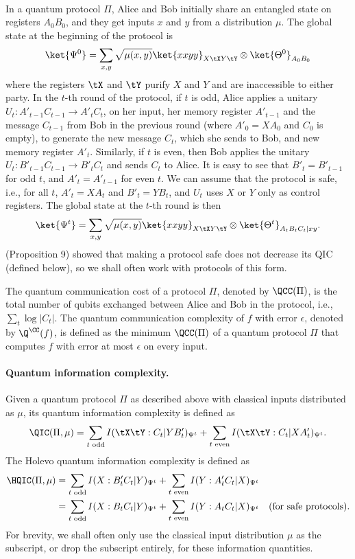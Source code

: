 \paragraph{} In a quantum protocol $\Pi$, Alice and Bob initially share an entangled state on registers $A_0B_0$, and they get inputs $x$ and $y$ from a distribution $\mu$. The global state at the beginning of the protocol is
\[ \ket{\Psi^0} = \sum_{x,y}\sqrt{\mu(x,y)}\ket{xxyy}_{X\tX Y\tY}\otimes\ket{\Theta^0}_{A_0B_0}\]
where the registers $\tX$ and $\tY$ purify $X$ and $Y$ and are inaccessible to either party. In the $t$-th round of the protocol, if $t$ is odd, Alice applies a unitary $U_t: A'_{t-1}C_{t-1} \to A'_tC_t$, on her input, her memory register $A'_{t-1}$ and the message $C_{t-1}$ from Bob in the previous round (where $A'_0=XA_0$ and $C_0$ is empty), to generate the new message $C_t$, which she sends to Bob, and new memory register $A'_t$. Similarly, if $t$ is even, then Bob applies the unitary $U_t: B'_{t-1}C_{t-1} \to B'_tC_t$ and sends $C_t$ to Alice. It is easy to see that $B'_t=B'_{t-1}$ for odd $t$, and $A'_t=A'_{t-1}$ for even $t$. We can assume that the protocol is safe, i.e., for all $t$, $A'_t=XA_t$ and $B'_t = YB_t$, and $U_t$ uses $X$ or $Y$ only as control registers. The global state at the $t$-th round is then
\[ \ket{\Psi^t} = \sum_{x,y}\sqrt{\mu(x,y)}\ket{xxyy}_{X\tX Y\tY}\otimes\ket{\Theta^t}_{A_tB_tC_t|xy}.\]
\cite{LT17} (Proposition 9) showed that making a protocol safe does not decrease its QIC (defined below), so we shall often work with protocols of this form.

The quantum communication cost of a protocol $\Pi$, denoted by $\QCC(\Pi)$, is the total number of qubits exchanged between Alice and Bob in the protocol, i.e., $\sum_t\log|C_t|$. The quantum communication complexity of $f$ with error $\epsilon$, denoted by $\Q^\CC(f)$, is defined as the minimum $\QCC(\Pi)$ of a quantum protocol $\Pi$ that computes $f$ with error at most $\epsilon$ on every input.

\paragraph{Quantum information complexity.} Given a quantum protocol $\Pi$ as described above with classical inputs distributed as $\mu$, its quantum information complexity is defined as
\[ \QIC(\Pi,\mu) = \sum_{t \text{ odd}}I(\tX\tY:C_t|YB'_t)_{\Psi^t} + \sum_{t\text{ even}}I(\tX\tY:C_t|XA'_t)_{\Psi^t}.\]
The Holevo quantum information complexity is defined as
\begin{align*}
\HQIC(\Pi,\mu) & = \sum_{t\text{ odd}}I(X:B'_tC_t|Y)_{\Psi^t} + \sum_{t\text{ even}}I(Y:A'_tC_t|X)_{\Psi^t} \\
 & = \sum_{t\text{ odd}}I(X:B_tC_t|Y)_{\Psi^t} + \sum_{t\text{ even}}I(Y:A_tC_t|X)_{\Psi^t} \quad \text{(for safe protocols).}
\end{align*}
For brevity, we shall often only use the classical input distribution $\mu$ as the subscript, or drop the subscript entirely, for these information quantities.

